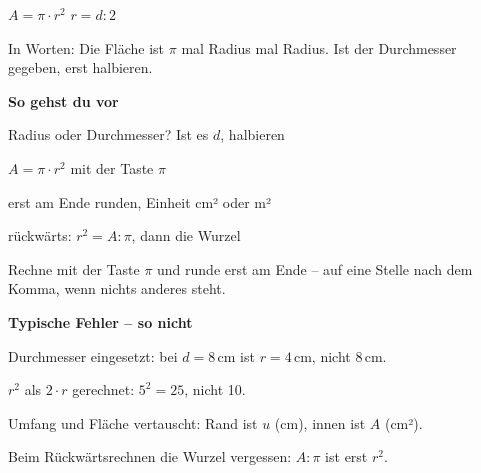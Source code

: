 \documentclass[11pt]{article}
\newcommand{\nr}[1]{\makebox[7mm][l]{\textbf{#1}}}
\begin{document}
\begin{tcolorbox}[colback=mbkasten,colframe=mbgrau,boxrule=0.5pt,arc=1mm,left=3mm,right=3mm,top=2mm,bottom=2mm,title={\bfseries Formel auf einen Blick},coltitle=black,colbacktitle=black!10]
\begin{minipage}[t]{0.58\linewidth}\vspace{0pt}
{\Large $A = \pi \cdot r^2$ \qquad $r = d : 2$}\par\medskip
In Worten: Die Fläche ist $\pi$ mal Radius mal Radius. Ist der Durchmesser gegeben, erst halbieren.\par\medskip
\textbf{So gehst du vor}\par
\nr{1}Radius oder Durchmesser? Ist es $d$, halbieren\par
\nr{2}$A = \pi \cdot r^2$ mit der Taste $\pi$\par
\nr{3}erst am Ende runden, Einheit cm² oder m²\par
\nr{4}rückwärts: $r^2 = A : \pi$, dann die Wurzel\par
\medskip
{\small Rechne mit der Taste $\pi$ und runde erst am Ende – auf eine Stelle nach dem Komma, wenn nichts anderes steht.}
\end{minipage}\hfill
\begin{minipage}[t]{0.38\linewidth}\vspace{2mm}\centering
{}
\end{minipage}
\end{tcolorbox}
\medskip\noindent\textbf{Typische Fehler – so nicht}\par\smallskip
\noindent\nr{$\times$}Durchmesser eingesetzt: bei $d = 8$\,cm ist $r = 4$\,cm, nicht 8\,cm.\par
\noindent\nr{$\times$}$r^2$ als $2 \cdot r$ gerechnet: $5^2 = 25$, nicht 10.\par
\noindent\nr{$\times$}Umfang und Fläche vertauscht: Rand ist $u$ (cm), innen ist $A$ (cm²).\par
\noindent\nr{$\times$}Beim Rückwärtsrechnen die Wurzel vergessen: $A : \pi$ ist erst $r^2$.\par
\end{document}
